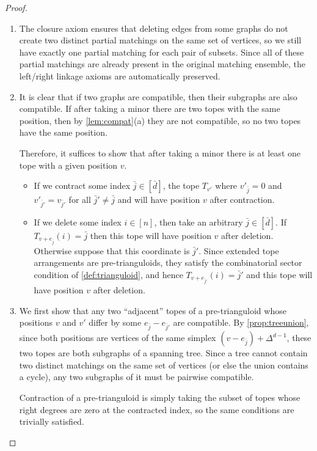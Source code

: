 \documentclass[letterpaper,reqno,11pt]{amsart}
\begin{document}
\begin{proof}
\begin{enumerate}
    \item[(b)] The closure axiom ensures that deleting edges from some graphs do not create two distinct partial matchings on the same set of vertices, so we still have exactly one partial matching for each pair of subsets. Since all of these partial matchings are already present in the original matching ensemble, the left/right linkage axioms are automatically preserved.

    \item[(c)] It is clear that if two graphs are compatible, then their subgraphs are also compatible. If after taking a minor there are two topes with the same position, then by \cref{lem:compat}(a) they are not compatible, so no two topes have the same position.
    
    Therefore, it suffices to show that after taking a minor there is at least one tope with a given position $v$. \begin{itemize}
        \item If we contract some index $\bar{j}\in [\bar{d}]$, the tope $T_{v'}$ where $v'_{\bar{j}} = 0$ and $v'_{\bar{j}'} = v_{\bar{j}'}$ for all $\bar{j}'\neq \bar{j}$ and will have position $v$ after contraction.
        \item If we delete some index $i\in [n]$, then take an arbitrary $\bar{j}\in [\bar{d}]$. If $T_{v + e_{\bar{j}}}(i) = \bar{j}$ then this tope will have position $v$ after deletion. Otherwise suppose that this coordinate is $\bar{j}'$. Since extended tope arrangements are pre-trianguloids, they satisfy the combinatorial sector condition of \cref{def:trianguloid}, and hence $T_{v + e_{\bar{j}'}} (i) = \bar{j}'$ and this tope will have position $v$ after deletion.
    \end{itemize}
    
    \item[(d)] We first show that any two ``adjacent'' topes of a pre-trianguloid whose positions $v$ and $v'$ differ by some $e_{\bar{j}} - e_{\bar{j}'}$ are compatible. By \cref{prop:treeunion}, since both positions are vertices of the same simplex $(v - e_{\bar{j}}) +\Delta^{d-1}$, these two topes are both subgraphs of a spanning tree. Since a tree cannot contain two distinct matchings on the same set of vertices (or else the union contains a cycle), any two subgraphs of it must be pairwise compatible.

    Contraction of a pre-trianguloid is simply taking the subset of topes whose right degrees are zero at the contracted index, so the same conditions are trivially satisfied. 
    

\end{enumerate}
\end{proof}
\end{document}

